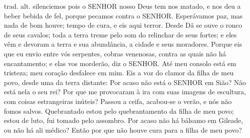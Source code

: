 {{trad. alt. silenciemos
} pois o SENHOR nosso Deus tem nos matado,
 e nos deu a beber bebida de fel, porque pecamos contra o SENHOR.
Esperávamos paz, mas nada de bom houve;
{} tempo de cura, e eis aqui terror.
Desde Dã se ouve o ronco de seus cavalos; toda a terra treme pelo som do relinchar de seus fortes; e eles vêm e devoram a terra e sua abundância, a cidade e seus moradores.
Porque eis que eu envio entre vós serpentes,
{} cobras venenosas, contra as quais não há encantamento; e elas vos morderão, diz o SENHOR.
Até meu consolo
 está em tristeza; meu coração desfalece em mim.
Eis a voz do clamor da filha de meu povo, desde uma da terra distante: Por acaso não está o SENHOR em Sião? Não está nela o seu rei? Por que me provocaram à ira com suas imagens de escultura, com coisas estrangeiras inúteis?
Passou a ceifa, acabou-se o verão, e nós não fomos salvos.
Quebrantado estou pelo quebrantamento da filha de meu povo; estou de luto, fui tomado pelo assombro.
Por acaso não há bálsamo em Gileade, ou não há ali médico? Então por que não houve cura para a filha de meu povo?

\par }

